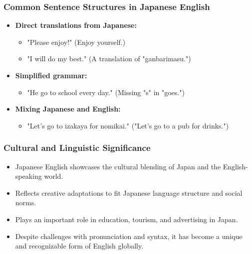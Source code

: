 \documentclass{beamer}
\begin{document}
\begin{frame}
\frametitle{Common Sentence Structures in Japanese English}
\begin{itemize}
    \item \textbf{Direct translations from Japanese:}
    \begin{itemize}
        \item "Please enjoy!" (Enjoy yourself.)
        \item "I will do my best." (A translation of "ganbarimasu.")
    \end{itemize}
    \item \textbf{Simplified grammar:}
    \begin{itemize}
        \item "He go to school every day." (Missing "s" in "goes.")
    \end{itemize}
    \item \textbf{Mixing Japanese and English:}
    \begin{itemize}
        \item "Let’s go to izakaya for nomikai." ("Let’s go to a pub for drinks.")
    \end{itemize}
\end{itemize}
\end{frame}

\begin{frame}
\frametitle{Cultural and Linguistic Significance}
\begin{itemize}
    \item Japanese English showcases the cultural blending of Japan and the English-speaking world.
    \item Reflects creative adaptations to fit Japanese language structure and social norms.
    \item Plays an important role in education, tourism, and advertising in Japan.
    \item Despite challenges with pronunciation and syntax, it has become a unique and recognizable form of English globally.
\end{itemize}
\end{frame}
\end{document}
